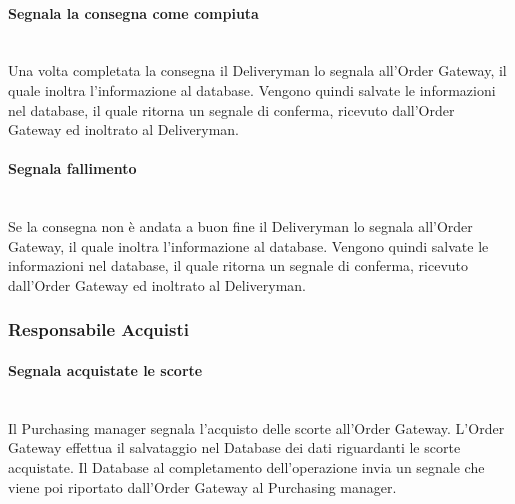 \paragraph{Segnala la consegna come compiuta}\mbox{}\\
Una volta completata la consegna il Deliveryman lo segnala all’Order Gateway, il quale inoltra l’informazione al database. Vengono quindi salvate le informazioni nel database, il quale ritorna un segnale di conferma, ricevuto dall’Order Gateway ed inoltrato al Deliveryman.

\paragraph{Segnala fallimento}\mbox{}\\
Se la consegna non è andata a buon fine il Deliveryman lo segnala all’Order Gateway, il quale inoltra l’informazione al database. Vengono quindi salvate le informazioni nel database, il quale ritorna un segnale di conferma, ricevuto dall’Order Gateway ed inoltrato al Deliveryman.

\subsubsection{Responsabile Acquisti}

\paragraph{Segnala acquistate le scorte}\mbox{}\\
Il Purchasing manager segnala l’acquisto delle scorte all’Order Gateway. L’Order Gateway effettua il salvataggio nel Database dei dati riguardanti le scorte acquistate. Il Database al completamento dell’operazione invia un segnale che viene poi riportato dall’Order Gateway al Purchasing manager.

